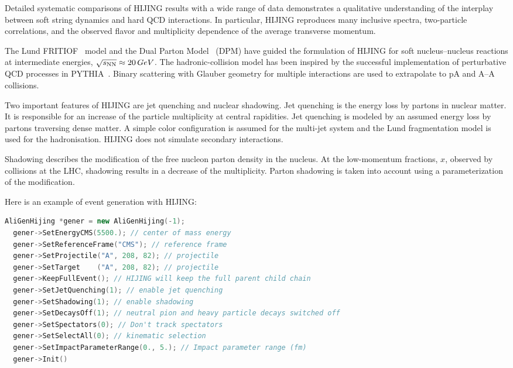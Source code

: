 \documentclass[12pt,a4paper,twoside]{article}
\begin{document}
Detailed systematic comparisons of HIJING results with a wide
range of data demonstrates a qualitative understanding of the
interplay between soft string dynamics and hard QCD interactions.
In particular, HIJING reproduces many inclusive spectra,
two-particle correlations, and the observed flavor and
multiplicity dependence of the average transverse momentum.

The Lund FRITIOF~\cite{MC:FRITIOF} model and the Dual Parton
Model~\cite{MC:DPM} (DPM) have guided the formulation of HIJING
for soft nucleus--nucleus reactions at intermediate energies,
$\sqrt{s_{\rm NN}}\approx 20\, GeV$.  The hadronic-collision
model has been inspired by the successful implementation of
perturbative QCD processes in PYTHIA~\cite{MC:PYTH}.  Binary
scattering with Glauber geometry for multiple interactions are
used to extrapolate to pA and A--A collisions.

Two important features of HIJING are jet quenching and nuclear
shadowing. Jet quenching is the energy loss by partons in nuclear
matter.  It is responsible for an increase of the particle
multiplicity at central rapidities.  Jet quenching is modeled by an
assumed energy loss by partons traversing dense matter.  A simple
color configuration is assumed for the multi-jet system and the Lund
fragmentation model is used for the hadronisation.  HIJING does not
simulate secondary interactions.

Shadowing describes the modification of the free nucleon parton
density in the nucleus.  At the low-momentum fractions, $x$,
observed by collisions at the LHC, shadowing results in a decrease
of the multiplicity. Parton shadowing is taken into account using
a parameterization of the modification.

Here is an example of event generation with HIJING:

\begin{lstlisting}[language=C++]
  AliGenHijing *gener = new AliGenHijing(-1);
  gener->SetEnergyCMS(5500.); // center of mass energy 
  gener->SetReferenceFrame("CMS"); // reference frame
  gener->SetProjectile("A", 208, 82); // projectile
  gener->SetTarget    ("A", 208, 82); // projectile
  gener->KeepFullEvent(); // HIJING will keep the full parent child chain
  gener->SetJetQuenching(1); // enable jet quenching
  gener->SetShadowing(1); // enable shadowing
  gener->SetDecaysOff(1); // neutral pion and heavy particle decays switched off
  gener->SetSpectators(0); // Don't track spectators
  gener->SetSelectAll(0); // kinematic selection
  gener->SetImpactParameterRange(0., 5.); // Impact parameter range (fm)
  gener->Init()
\end{lstlisting}
\end{document}
